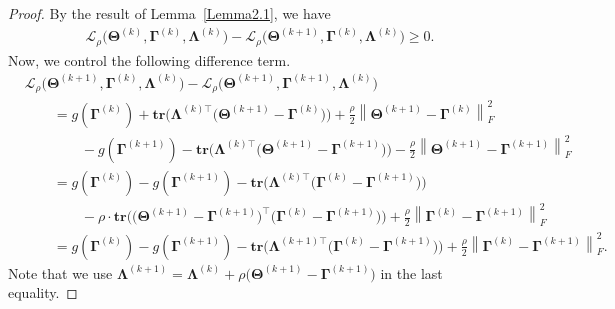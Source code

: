 \documentclass[alpha-refs]{wiley-article}
\begin{document}
\begin{proof}
By the result of Lemma~\ref{Lemma2.1}, we have
\begin{align} \label{ineq1}
    \mathcal{L}_{\rho} \big( \boldsymbol{\Theta}^{(k)},\boldsymbol{\Gamma}^{(k)},\boldsymbol{\Lambda}^{(k)} \big)
    - \mathcal{L}_{\rho} \big( \boldsymbol{\Theta}^{(k+1)},\boldsymbol{\Gamma}^{(k)},\boldsymbol{\Lambda}^{(k)} \big)
    \geq 0.
\end{align}
Now, we control the following difference term.
\begin{align} \label{ineq2}
    &\mathcal{L}_{\rho} \big( \boldsymbol{\Theta}^{(k+1)},\boldsymbol{\Gamma}^{(k)},\boldsymbol{\Lambda}^{(k)} \big)
    - \mathcal{L}_{\rho} \big( \boldsymbol{\Theta}^{(k+1)},\boldsymbol{\Gamma}^{(k+1)},\boldsymbol{\Lambda}^{(k)} \big) \nonumber \\
    &\qquad = g(\boldsymbol{\Gamma}^{(k)}) + \textbf{tr}\big( \boldsymbol{\Lambda}^{(k)\top}\big(\boldsymbol{\Theta}^{(k+1)}-\boldsymbol{\Gamma}^{(k)}\big)\big)
    +\frac{\rho}{2}\left\| \boldsymbol{\Theta}^{(k+1)}-\boldsymbol{\Gamma}^{(k)} \right\|_{F}^{2} \nonumber \\
    &\qquad \qquad - g(\boldsymbol{\Gamma}^{(k+1)}) - \textbf{tr}\big( \boldsymbol{\Lambda}^{(k)\top}\big(\boldsymbol{\Theta}^{(k+1)}-\boldsymbol{\Gamma}^{(k+1)}\big)\big)
    -\frac{\rho}{2}\left\| \boldsymbol{\Theta}^{(k+1)}-\boldsymbol{\Gamma}^{(k+1)} \right\|_{F}^{2} \nonumber \\
    &\qquad = g(\boldsymbol{\Gamma}^{(k)})-g(\boldsymbol{\Gamma}^{(k+1)}) - \textbf{tr}\big( \boldsymbol{\Lambda}^{(k)\top}\big(\boldsymbol{\Gamma}^{(k)}-\boldsymbol{\Gamma}^{(k+1)}\big)\big) \nonumber \\
    &\qquad \qquad - \rho \cdot \textbf{tr}\big( \big(\boldsymbol{\Theta}^{(k+1)}-\boldsymbol{\Gamma}^{(k+1)}\big)^{\top}
    \big(\boldsymbol{\Gamma}^{(k)}-\boldsymbol{\Gamma}^{(k+1)}\big) \big) + \frac{\rho}{2}\left\| \boldsymbol{\Gamma}^{(k)}-\boldsymbol{\Gamma}^{(k+1)} \right\|_{F}^{2}  \nonumber \\
    &\qquad = g(\boldsymbol{\Gamma}^{(k)})-g(\boldsymbol{\Gamma}^{(k+1)}) - \textbf{tr}\big( \boldsymbol{\Lambda}^{(k+1)\top}\big(\boldsymbol{\Gamma}^{(k)}-\boldsymbol{\Gamma}^{(k+1)}\big)\big) + \frac{\rho}{2}\left\| \boldsymbol{\Gamma}^{(k)}-\boldsymbol{\Gamma}^{(k+1)} \right\|_{F}^{2}.
\end{align}
Note that we use $\boldsymbol{\Lambda}^{(k+1)}=\boldsymbol{\Lambda}^{(k)}+\rho\big(\boldsymbol{\Theta}^{(k+1)}-\boldsymbol{\Gamma}^{(k+1)}\big)$ in the last equality.

\end{proof}
\end{document}
